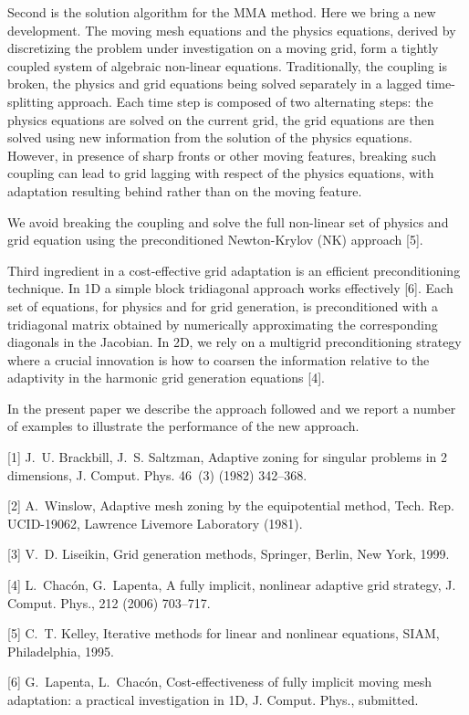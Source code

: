 \documentclass{report}
\begin{document}
Second is the solution algorithm for the MMA method. Here we bring
a new development. The moving mesh equations and the physics equations,
derived by discretizing the problem under investigation on a moving
grid, form a tightly coupled system of algebraic non-linear equations.
Traditionally, the coupling is broken, the physics and grid equations
being solved separately in a lagged time-splitting approach. Each
time step is composed of two alternating steps: the physics equations
are solved on the current grid, the grid equations are then solved
using new information from the solution of the physics equations.
However, in presence of sharp fronts or other moving features, breaking
such coupling can lead to grid lagging with respect of the physics
equations, with adaptation resulting behind rather than on the moving
feature.

We avoid breaking the coupling and solve the full non-linear set of
physics and grid equation using the preconditioned Newton-Krylov
(NK) approach [5].

Third ingredient in a cost-effective grid adaptation is an efficient
preconditioning technique. In 1D a simple block tridiagonal approach
works effectively [6]. Each set of equations, for physics and for
grid generation, is preconditioned with a tridiagonal matrix
obtained by numerically approximating the corresponding diagonals in
the Jacobian. In 2D, we rely on a multigrid preconditioning strategy
where a crucial innovation is how to coarsen the information
relative to the adaptivity in the harmonic grid generation equations
[4].

In the present paper we describe the approach followed and we report
a number of examples to illustrate the performance of the new
approach.


[1] J.~U. Brackbill, J.~S. Saltzman, Adaptive zoning for singular
problems in 2 dimensions, J. Comput. Phys. 46~(3) (1982) 342--368.

[2] A.~Winslow, Adaptive mesh zoning by the equipotential method,
Tech. Rep. UCID-19062, Lawrence Livemore Laboratory (1981).

[3] V.~D. Liseikin, Grid generation methods, Springer, Berlin, New
York, 1999.

[4] L.~Chac\'{o}n, G.~Lapenta, A fully implicit, nonlinear adaptive
grid strategy, J. Comput. Phys., 212 (2006) 703--717.

[5] C.~T. Kelley, Iterative methods for linear and nonlinear
equations, SIAM, Philadelphia, 1995.

[6] G.~Lapenta, L.~Chac\'{o}n, Cost-effectiveness of fully implicit
moving mesh adaptation: a practical investigation in 1D, J. Comput.
Phys., submitted.
\end{document}
